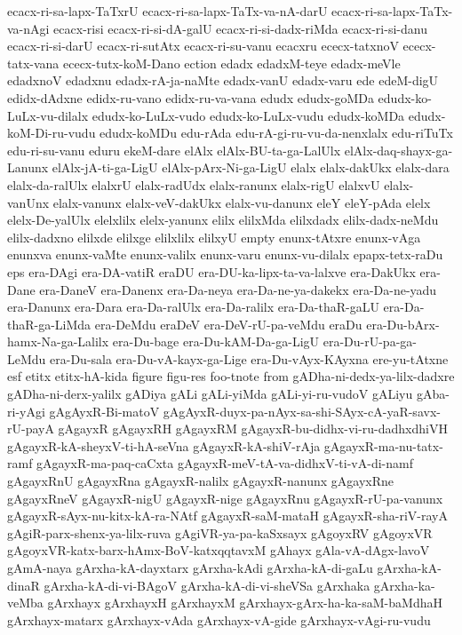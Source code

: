 {ecacx-ri-sa-lapx-TaTxrU
ecacx-ri-sa-lapx-TaTx-va-nA-darU
ecacx-ri-sa-lapx-TaTx-va-nAgi
ecacx-risi
ecacx-ri-si-dA-galU
ecacx-ri-si-dadx-riMda
ecacx-ri-si-danu
ecacx-ri-si-darU
ecacx-ri-sutAtx
ecacx-ri-su-vanu
ecacxru
ececx-tatxnoV
ececx-tatx-vana
ececx-tutx-koM-Dano
ection
edadx
edadxM-teye
edadx-meVle
edadxnoV
edadxnu
edadx-rA-ja-naMte
edadx-vanU
edadx-varu
ede
edeM-digU
edidx-dAdxne
edidx-ru-vano
edidx-ru-va-vana
edudx
edudx-goMDa
edudx-ko-LuLx-vu-dilalx
edudx-ko-LuLx-vudo
edudx-ko-LuLx-vudu
edudx-koMDa
edudx-koM-Di-ru-vudu
edudx-koMDu
edu-rAda
edu-rA-gi-ru-vu-da-nenxlalx
edu-riTuTx
edu-ri-su-vanu
eduru
ekeM-dare
elAlx
elAlx-BU-ta-ga-LalUlx
elAlx-daq-shayx-ga-Lanunx
elAlx-jA-ti-ga-LigU
elAlx-pArx-Ni-ga-LigU
elalx
elalx-dakUkx
elalx-dara
elalx-da-ralUlx
elalxrU
elalx-radUdx
elalx-ranunx
elalx-rigU
elalxvU
elalx-vanUnx
elalx-vanunx
elalx-veV-dakUkx
elalx-vu-danunx
eleY
eleY-pAda
elelx
elelx-De-yalUlx
elelxlilx
elelx-yanunx
elilx
elilxMda
elilxdadx
elilx-dadx-neMdu
elilx-dadxno
elilxde
elilxge
elilxlilx
elilxyU
empty
enunx-tAtxre
enunx-vAga
enunxva
enunx-vaMte
enunx-valilx
enunx-varu
enunx-vu-dilalx
epapx-tetx-raDu
eps
era-DAgi
era-DA-vatiR
eraDU
era-DU-ka-lipx-ta-va-lalxve
era-DakUkx
era-Dane
era-DaneV
era-Danenx
era-Da-neya
era-Da-ne-ya-dakekx
era-Da-ne-yadu
era-Danunx
era-Dara
era-Da-ralUlx
era-Da-ralilx
era-Da-thaR-gaLU
era-Da-thaR-ga-LiMda
era-DeMdu
eraDeV
era-DeV-rU-pa-veMdu
eraDu
era-Du-bArx-hamx-Na-ga-Lalilx
era-Du-bage
era-Du-kAM-Da-ga-LigU
era-Du-rU-pa-ga-LeMdu
era-Du-sala
era-Du-vA-kayx-ga-Lige
era-Du-vAyx-KAyxna
ere-yu-tAtxne
esf
etitx
etitx-hA-kida
figure
figu-res
foo-tnote
from
gADha-ni-dedx-ya-lilx-dadxre
gADha-ni-derx-yalilx
gADiya
gALi
gALi-yiMda
gALi-yi-ru-vudoV
gALiyu
gAba-ri-yAgi
gAgAyxR-Bi-matoV
gAgAyxR-duyx-pa-nAyx-sa-shi-SAyx-cA-yaR-savx-rU-payA
gAgayxR
gAgayxRH
gAgayxRM
gAgayxR-bu-didhx-vi-ru-dadhxdhiVH
gAgayxR-kA-sheyxV-ti-hA-seVna
gAgayxR-kA-shiV-rAja
gAgayxR-ma-nu-tatx-ramf
gAgayxR-ma-paq-caCxta
gAgayxR-meV-tA-va-didhxV-ti-vA-di-namf
gAgayxRnU
gAgayxRna
gAgayxR-nalilx
gAgayxR-nanunx
gAgayxRne
gAgayxRneV
gAgayxR-nigU
gAgayxR-nige
gAgayxRnu
gAgayxR-rU-pa-vanunx
gAgayxR-sAyx-nu-kitx-kA-ra-NAtf
gAgayxR-saM-mataH
gAgayxR-sha-riV-rayA
gAgiR-parx-shenx-ya-lilx-ruva
gAgiVR-ya-pa-kaSxsayx
gAgoyxRV
gAgoyxVR
gAgoyxVR-katx-barx-hAmx-BoV-katxqqtavxM
gAhayx
gAla-vA-dAgx-lavoV
gAmA-naya
gArxha-kA-dayxtarx
gArxha-kAdi
gArxha-kA-di-gaLu
gArxha-kA-dinaR
gArxha-kA-di-vi-BAgoV
gArxha-kA-di-vi-sheVSa
gArxhaka
gArxha-ka-veMba
gArxhayx
gArxhayxH
gArxhayxM
gArxhayx-gArx-ha-ka-saM-baMdhaH
gArxhayx-matarx
gArxhayx-vAda
gArxhayx-vA-gide
gArxhayx-vAgi-ru-vudu
}

